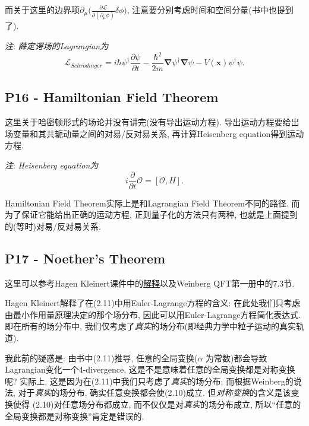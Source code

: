 \documentclass[10pt,b5paper,openany]{book}
\begin{document}
而关于这里的边界项$\partial_\mu \bigl(\frac{\partial \mathcal{L}}{\partial(\partial_\mu \phi)}\delta \phi \bigr)$, 注意要分别考虑时间和空间分量(书中也提到了). 

\textit{注}: \textit{薛定谔场的Lagrangian为}
\begin{equation}
  \boxed{
    \mathcal{L}_{Schr\ddot{o}dinger} = i\hbar\psi^\dagger\frac{\partial \psi}{\partial t} - \frac{\hbar^2}{2m}\boldsymbol{\nabla}\psi^\dagger\boldsymbol{\nabla}\psi - V(\mathbf x)\psi^\dagger\psi.
  }
\end{equation}

\subsection{P16 - Hamiltonian Field Theorem}

这里关于哈密顿形式的场论并没有讲完(没有导出运动方程). 导出运动方程要给出场变量和其共轭动量之间的对易/反对易关系, 再计算Heisenberg equation得到运动方程. 

\textit{注}: \textit{Heisenberg equation为}
\begin{equation}
  i\frac{\partial}{\partial t}\mathcal{O} = [\mathcal{O}, H].
\end{equation}

Hamiltonian Field Theorem实际上是和Lagrangian Field Theorem不同的路径. 而为了保证它能给出正确的运动方程, 正则量子化的方法只有两种, 也就是上面提到的(等时)对易/反对易关系. 

\subsection{P17 - Noether's Theorem}

这里可以参考Hagen Kleinert课件中的\href{http://users.physik.fu-berlin.de/~kleinert/b6/psfiles/Chapter-7-conslaw.pdf}{解释}以及Weinberg QFT第一册中的7.3节. 

Hagen Kleinert解释了在(2.11)中用Euler-Lagrange方程的含义: 在此处我们只考虑由最小作用量原理决定的那个场分布, 因此可以用Euler-Lagrange方程简化表达式. 即在所有的场分布中, 我们仅考虑了\textit{真实}的场分布(即经典力学中粒子运动的真实轨道). 

我此前的疑惑是: 由书中(2.11)推导, 任意的全局变换($\alpha$ 为常数)都会导致Lagrangian变化一个4-divergence, 这是不是意味着任意的全局变换都是对称变换呢? 实际上, 这是因为在(2.11)中我们只考虑了\textit{真实}的场分布; 而根据Weinberg的说法, 对于\textit{真实}的场分布, 确实任意变换都会使(2.10)成立. 但\textit{对称变换}的含义是该变换使得 (2.10)对任意场分布都成立, 而不仅仅是对\textit{真实}的场分布成立, 所以“任意的全局变换都是对称变换”肯定是错误的. 
\end{document}
